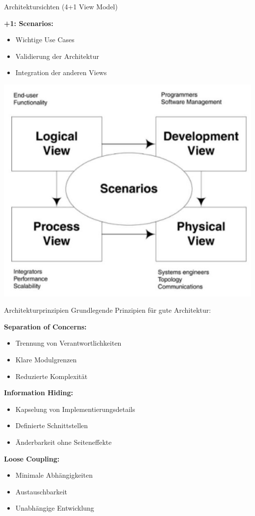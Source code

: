 \begin{concept}{Architektursichten (4+1 View Model)}
    
\textbf{+1: Scenarios:}
    \begin{itemize}
        \item Wichtige Use Cases
        \item Validierung der Architektur
        \item Integration der anderen Views
    \end{itemize}
\includegraphics[width=0.9\linewidth]{images/2024_12_29_0d1d7b5551ea1b4b41bdg-09}
\end{concept}

\begin{concept}{Architekturprinzipien}
Grundlegende Prinzipien für gute Architektur:

\textbf{Separation of Concerns:}
\begin{itemize}
    \item Trennung von Verantwortlichkeiten
    \item Klare Modulgrenzen
    \item Reduzierte Komplexität
\end{itemize}

\textbf{Information Hiding:}
\begin{itemize}
    \item Kapselung von Implementierungsdetails
    \item Definierte Schnittstellen
    \item Änderbarkeit ohne Seiteneffekte
\end{itemize}

\textbf{Loose Coupling:}
\begin{itemize}
    \item Minimale Abhängigkeiten
    \item Austauschbarkeit
    \item Unabhängige Entwicklung
\end{itemize}
\end{concept}


